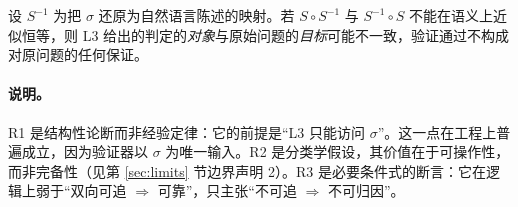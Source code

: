 \begin{proposition}[R3：双向可追是可靠性的前提]\label{prop:r3}
设 $S^{-1}$ 为把 $\sigma$ 还原为自然语言陈述的映射。若 $S \circ S^{-1}$ 与 $S^{-1} \circ S$ 不能在语义上近似恒等，则 L3 给出的判定的\emph{对象}与原始问题的\emph{目标}可能不一致，验证通过不构成对原问题的任何保证。
\end{proposition}

\paragraph{说明。}R1 是结构性论断而非经验定律：它的前提是“L3 只能访问 $\sigma$”。这一点在工程上普遍成立，因为验证器以 $\sigma$ 为唯一输入。R2 是分类学假设，其价值在于可操作性，而非完备性（见第 \ref{sec:limits} 节边界声明 2）。R3 是必要条件式的断言：它在逻辑上弱于“双向可追 $\Rightarrow$ 可靠”，只主张“不可追 $\Rightarrow$ 不可归因”。
